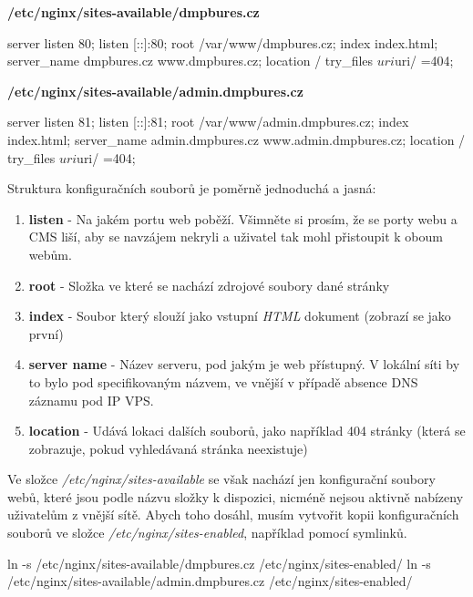 \documentclass[12pt,a4paper]{report}
\begin{document}
  \noindent\textbf{/etc/nginx/sites-available/dmpbures.cz}
  \begin{bash}
  server {
    listen 80;
    listen [::]:80;
    root /var/www/dmpbures.cz;
    index index.html;
    server_name dmpbures.cz www.dmpbures.cz;
    location / {
      try_files $uri $uri/ =404;
    }
  }
  \end{bash}

  \noindent\textbf{/etc/nginx/sites-available/admin.dmpbures.cz}
  \begin{bash}
  server {
    listen 81;
    listen [::]:81;
    root /var/www/admin.dmpbures.cz;
    index index.html;
    server_name admin.dmpbures.cz www.admin.dmpbures.cz;
    location / {
      try_files $uri $uri/ =404;
    }
  }
  \end{bash}
  
  Struktura konfiguračních souborů je poměrně jednoduchá a jasná: 
  \begin{enumerate}
    \item \textbf{listen} - Na jakém portu web poběží. Všimněte si prosím, že se porty webu a CMS liší, aby se navzájem nekryli a uživatel tak mohl přistoupit k oboum webům.
    \item \textbf{root} - Složka ve které se nachází zdrojové soubory dané stránky
    \item \textbf{index} - Soubor který slouží jako vstupní \emph{HTML} dokument (zobrazí se jako první)
    \item \textbf{server name} - Název serveru, pod jakým je web přístupný. V lokální síti by to bylo pod specifikovaným názvem, ve vnější v případě absence DNS záznamu pod IP VPS.
    \item \textbf{location} - Udává lokaci dalších souborů, jako například 404 stránky (která se zobrazuje, pokud vyhledávaná stránka neexistuje)
  \end{enumerate}

  Ve složce \emph{/etc/nginx/sites-available} se však nachází jen konfigurační soubory webů,
  které jsou podle názvu složky k dispozici, nicméně nejsou aktivně nabízeny uživatelům z vnější sítě. 
  Abych toho dosáhl, musím vytvořit kopii konfiguračních souborů ve složce \emph{/etc/nginx/sites-enabled}, například pomocí symlinků.

  \begin{bash}
    ln -s /etc/nginx/sites-available/dmpbures.cz 
    /etc/nginx/sites-enabled/
    ln -s /etc/nginx/sites-available/admin.dmpbures.cz
     /etc/nginx/sites-enabled/
  \end{bash}
\end{document}
